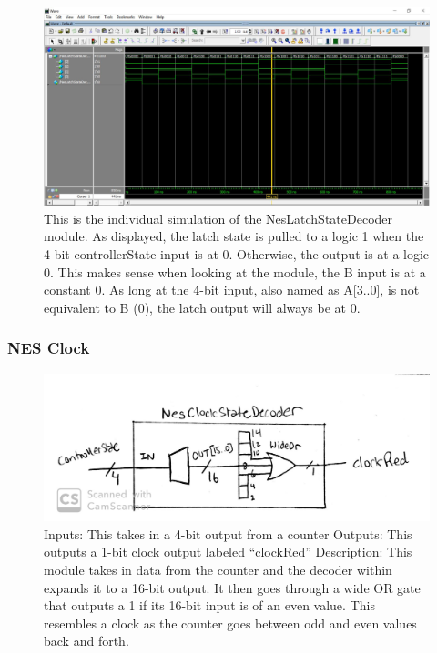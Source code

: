 \documentclass[a4paper]{article}
\begin{document}
\begin{figure}[H]
  \centering
    \includegraphics[width=.85\textwidth]{images/ModelSim/neslatch_sim.JPG}
	\caption{This is the individual simulation of the NesLatchStateDecoder module. As displayed, the latch state is pulled to a logic 1 when the 4-bit controllerState input is at 0. Otherwise, the output is at a logic 0. This makes sense when looking at the module, the B input is at a constant 0. As long at the 4-bit input, also named as A[3..0], is not equivalent to B (0), the latch output will always be at 0.}
    \label{fig:latch_sim}
\end{figure}

\subsubsection{NES Clock}

\begin{figure}[H]
  \centering
    \includegraphics[width=.85\textwidth]{images/block_diagrams/nes/clock4.jpg}
	\caption{Inputs: This takes in a 4-bit output from a counter
Outputs: This outputs a 1-bit clock output labeled “clockRed”
Description: This module takes in data from the counter and the decoder within expands it to a 16-bit output. It then goes through a wide OR gate that outputs a 1 if its 16-bit input is of an even value. This resembles a clock as the counter goes between odd and even values back and forth.}
    \label{fig:clock}
\end{figure}
\end{document}
